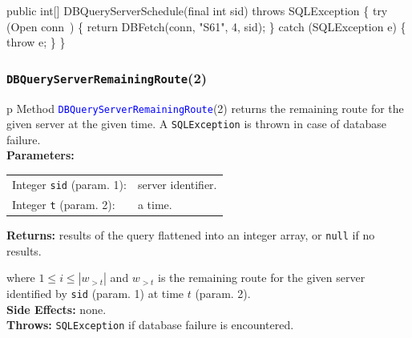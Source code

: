 \documentclass{article}
\def\nwendcode{\endtrivlist \endgroup}      %
\let\nwdocspar=\par
\theoremstyle{definition}                   %
\begin{document}
public int[] DBQueryServerSchedule(final int sid) throws SQLException \{
  try (\LA{}Open \code{}conn\edoc{}~{\nwtagstyle{}}\RA{}) \{
    return DBFetch(conn, "S61", 4, sid);
  \} catch (SQLException e) \{
    throw e;
  \}
\}
\eatline
{}\nwendcode{}\nwdocspar
\subsubsection{{\tt{}\protect{}DBQueryServerRemainingRoute}(2)}
\begin{tabular}{p{\textwidth}}
\toprule
{}
Method \textcolor{blue}{{\tt{}\protect{}DBQueryServerRemainingRoute}}(2) returns the
remaining route for the given server at the given time.
A {\tt{}SQLException} is thrown in case of database failure.\\
\midrule
\textbf{Parameters:} \\
\begin{tabular}{lp{116mm}}
Integer {\tt{}sid} (param. 1):&server identifier.\\
Integer {\tt{}t} (param. 2):&a time.\\
\end{tabular}
\textbf{Returns:} results of the query flattened into an integer array,
or {\tt{}null} if no results.


where $1\leq i\leq |w_{>t}|$ and $w_{>t}$ is the remaining route for the
given server identified by {\tt{}sid} (param. 1) at time $t$ (param. 2).\\
\textbf{Side Effects:} none.\\
\textbf{Throws:} {\tt{}SQLException} if database failure is encountered.\\
\bottomrule
\end{tabular}
\end{document}
